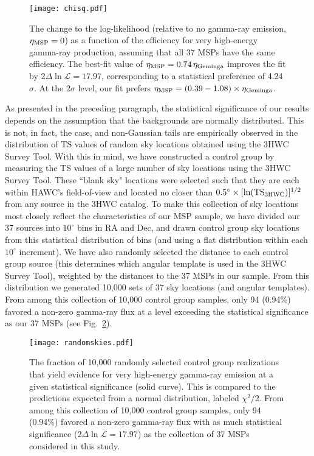 \documentclass[aps,prd,twocolumn,amsmath,superscriptaddress,amssymb,showpacs,floatfix,nofootinbib,longbibliography,preprintnumbers]{revtex4-1}
\begin{document}
\begin{figure}
\texttt{[image: chisq.pdf]}
\caption{The change to the log-likelihood (relative to no gamma-ray emission, $\eta_{\rm MSP}=0$) as a function of the efficiency for very high-energy gamma-ray production, assuming that all 37 MSPs have the same efficiency. The best-fit value of $\eta_{\rm MSP} = 0.74 \, \eta_{\rm Geminga}$ improves the fit by $2\Delta \ln \mathcal{L} = 17.97$, corresponding to a statistical preference of 4.24$\sigma$. At the $2\sigma$ level, our fit prefers $\eta_{\rm MSP} = (0.39-1.08) \times \eta_{\rm Geminga}$.}
\label{joint}
\end{figure}



As presented in the preceding paragraph, the statistical significance of our results depends on the assumption that the backgrounds are normally distributed. This is not, in fact, the case, and non-Gaussian tails are empirically observed in the distribution of TS values of random sky locations obtained using the 3HWC Survey Tool. With this in mind, we have constructed a control group by measuring the TS values of a large number of sky locations using the 3HWC Survey Tool. These ``blank sky" locations were selected such that they are each within HAWC's field-of-view and located no closer than $0.5^{\circ} \times [\ln ({\rm TS}_{\rm 3HWC})]^{1/2}$ from any source in the 3HWC catalog. To make this collection of sky locations most closely reflect the characteristics of our MSP sample, we have divided our 37 sources into $10^{\circ}$ bins in RA and Dec, and drawn control group sky locations from this statistical distribution of bins (and using a flat distribution within each $10^{\circ}$ increment). We have also randomly selected the distance to each control group source (this determines which angular template is used in the 3HWC Survey Tool), weighted by the distances to the 37 MSPs in our sample. From this distribution we generated 10,000 sets of 37 sky locations (and angular templates). From among this collection of 10,000 control group samples, only 94 (0.94\%) favored a non-zero gamma-ray flux at a level exceeding the statistical significance as our 37 MSPs (see Fig.~\ref{randomskies}).

 
 
\begin{figure}
\texttt{[image: randomskies.pdf]}
\caption{The fraction of 10,000 randomly selected control group realizations that yield evidence for very high-energy gamma-ray emission at a given statistical significance (solid curve). This is compared to the predictions expected from a normal distribution, labeled $\chi^2/2$. From among this collection of 10,000 control group samples, only 94 (0.94\%) favored a non-zero gamma-ray flux with as much statistical significance ($2\Delta \ln \mathcal{L}=17.97$) as the collection of 37 MSPs considered in this study.}
\label{randomskies}
\end{figure}
 
\end{document}

